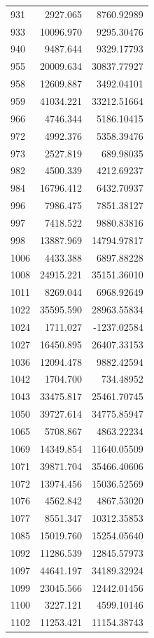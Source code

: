 \documentclass[
  12pt,
]{article}
\begin{document}
\begin{longtable}[]{@{}lrr@{}}
931 & 2927.065 & 8760.92989 \\
933 & 10096.970 & 9295.30476 \\
940 & 9487.644 & 9329.17793 \\
955 & 20009.634 & 30837.77927 \\
958 & 12609.887 & 3492.04101 \\
959 & 41034.221 & 33212.51664 \\
966 & 4746.344 & 5186.10415 \\
972 & 4992.376 & 5358.39476 \\
973 & 2527.819 & 689.98035 \\
982 & 4500.339 & 4212.69237 \\
984 & 16796.412 & 6432.70937 \\
996 & 7986.475 & 7851.38127 \\
997 & 7418.522 & 9880.83816 \\
998 & 13887.969 & 14794.97817 \\
1006 & 4433.388 & 6897.88228 \\
1008 & 24915.221 & 35151.36010 \\
1011 & 8269.044 & 6968.92649 \\
1022 & 35595.590 & 28963.55834 \\
1024 & 1711.027 & -1237.02584 \\
1027 & 16450.895 & 26407.33153 \\
1036 & 12094.478 & 9882.42594 \\
1042 & 1704.700 & 734.48952 \\
1043 & 33475.817 & 25461.70745 \\
1050 & 39727.614 & 34775.85947 \\
1065 & 5708.867 & 4863.22234 \\
1069 & 14349.854 & 11640.05509 \\
1071 & 39871.704 & 35466.40606 \\
1072 & 13974.456 & 15036.52569 \\
1076 & 4562.842 & 4867.53020 \\
1077 & 8551.347 & 10312.35853 \\
1085 & 15019.760 & 15254.05640 \\
1092 & 11286.539 & 12845.57973 \\
1097 & 44641.197 & 34189.32924 \\
1099 & 23045.566 & 12442.01456 \\
1100 & 3227.121 & 4599.10146 \\
1102 & 11253.421 & 11154.38743 \\

\end{longtable}
\end{document}
